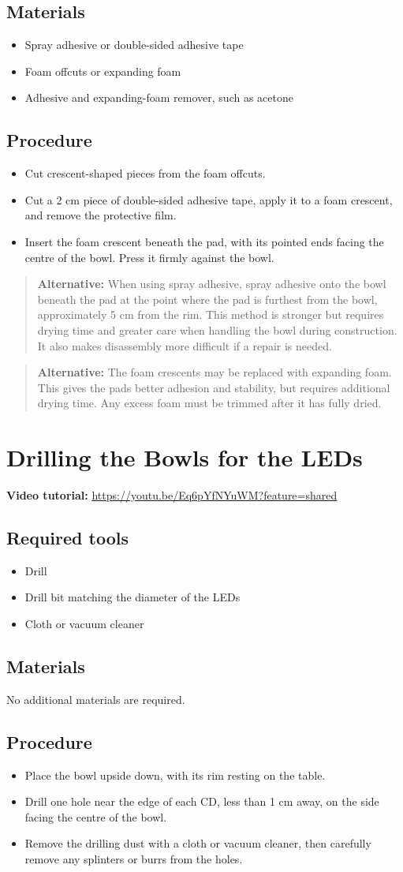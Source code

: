 \documentclass[11pt,a4paper]{article}
\newcommand{\tutorial}[1]{\textbf{Video tutorial:} \url{#1}}
\newcommand{\tools}{\subsection{Required tools}}
\newcommand{\materials}{\subsection{Materials}}
\newcommand{\procedure}{\subsection{Procedure}}
\newcommand{\alternative}[1]{\begin{quote}\textbf{Alternative:} #1\end{quote}}
\begin{document}
\materials
\begin{itemize}
  \item Spray adhesive or double-sided adhesive tape
  \item Foam offcuts or expanding foam
  \item Adhesive and expanding-foam remover, such as acetone
\end{itemize}

\procedure
\begin{itemize}
  \item Cut crescent-shaped pieces from the foam offcuts.
  \item Cut a 2 cm piece of double-sided adhesive tape, apply it to a foam crescent, and remove the protective film.
  \item Insert the foam crescent beneath the pad, with its pointed ends facing the centre of the bowl. Press it firmly against the bowl.
\end{itemize}

\alternative{When using spray adhesive, spray adhesive onto the bowl beneath the pad at the point where the pad is furthest from the bowl, approximately 5 cm from the rim. This method is stronger but requires drying time and greater care when handling the bowl during construction. It also makes disassembly more difficult if a repair is needed.}

\alternative{The foam crescents may be replaced with expanding foam. This gives the pads better adhesion and stability, but requires additional drying time. Any excess foam must be trimmed after it has fully dried.}

\section{Drilling the Bowls for the LEDs}
\tutorial{https://youtu.be/Eq6pYfNYuWM?feature=shared}

\tools
\begin{itemize}
  \item Drill
  \item Drill bit matching the diameter of the LEDs
  \item Cloth or vacuum cleaner
\end{itemize}

\materials
No additional materials are required.

\procedure
\begin{itemize}
  \item Place the bowl upside down, with its rim resting on the table.
  \item Drill one hole near the edge of each CD, less than 1 cm away, on the side facing the centre of the bowl.
  \item Remove the drilling dust with a cloth or vacuum cleaner, then carefully remove any splinters or burrs from the holes.
\end{itemize}
\end{document}
